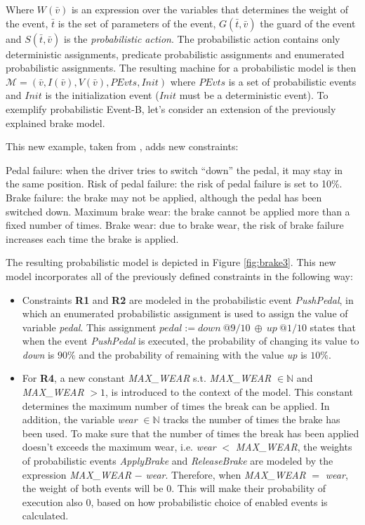 Where $W( \bar{v})$ is an expression over the variables that determines the weight of the event, $\bar{t}$ is the set of parameters of the event, $G(\bar{t}, \bar{v})$ the guard of the event and $S(\bar{t}, \bar{v})$ is the \textit{probabilistic action}. The probabilistic action contains only deterministic assignments, predicate probabilistic assignments and enumerated probabilistic assignments. The resulting machine for a probabilistic model is then $\mathscr{M} =(\bar{v}, I(\bar{v}), V(\bar{v}), PEvts, Init)$ where $PEvts$ is a set of probabilistic events and $Init$ is the initialization event ($Init$ must be a deterministic event). To exemplify probabilistic Event-B, let's consider an extension of the previously explained brake model. 

\begin{example}
\normalfont
This new example, taken from \cite{Aouadhi2017}, adds new constraints:
\begin{itemize}
    \itema Pedal failure: when the driver tries to switch “down” the pedal, it may stay in the same position.
    \itemb Risk of pedal failure: the risk of pedal failure is set to 10\%.
    \itemc Brake failure: the brake may not be applied, although the pedal has been switched down.
    \itemd Maximum brake wear: the brake cannot be applied more than a fixed number of times.
    \iteme Brake wear: due to brake wear, the risk of brake failure increases each time the brake is applied.
\end{itemize}
The resulting probabilistic model is depicted in Figure \ref{fig:brake3}. This new model incorporates all of the previously defined constraints in the following way:
\begin{itemize}
    \item Constraints \textbf{R1} and \textbf{R2} are modeled in the probabilistic event \textit{PushPedal}, in which an enumerated probabilistic assignment is used to assign the value of variable \textit{pedal}. This assignment $pedal := down \ @9/10  \ \oplus \ up \ @1/10$ states that when the event \textit{PushPedal} is executed, the probability of changing its value to \textit{down} is $90\%$ and the probability of remaining with the value \textit{up} is $10\%$.
    \item For \textbf{R4}, a new constant \textit{MAX\_WEAR} s.t. \textit{MAX\_WEAR} $\in \mathbb{N}$ and \textit{MAX\_WEAR} $> 1$, is introduced to the context of the model. This constant determines the maximum number of times the break can be applied. In addition, the variable \textit{wear} $\in \mathbb{N}$ tracks the number of times the brake has been used. To make sure that the number of times the break has been applied doesn't exceeds the maximum wear, i.e. \textit{wear} $<$ \textit{MAX\_WEAR}, the weights of probabilistic events \textit{ApplyBrake} and \textit{ReleaseBrake} are modeled by the expression \textit{MAX\_WEAR} $-$ \textit{wear}. Therefore, when \textit{MAX\_WEAR} $=$ \textit{wear}, the weight of both events will be 0. This will make their probability of execution also 0, based on how probabilistic choice of enabled events is calculated.

\end{itemize}
\end{example}
